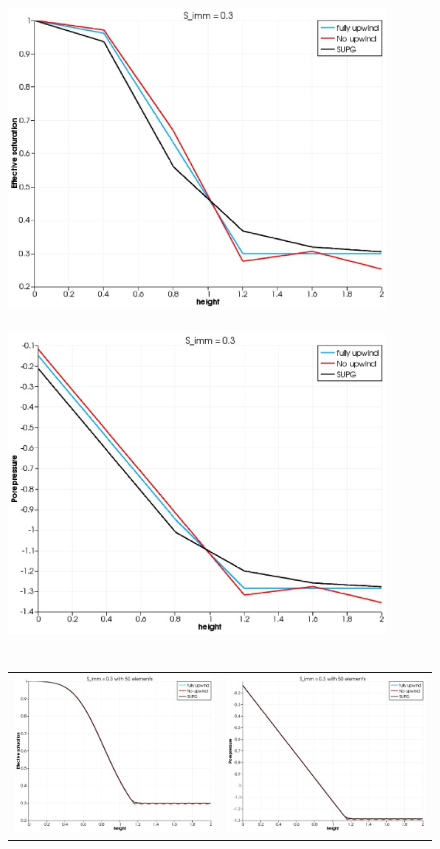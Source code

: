 \documentclass[]{scrreprt}
\begin{document}
\begin{figure}[htb]
\centering
\includegraphics[width=10cm]{gh_seff.eps} \\
$\mbox{}$ \\
\includegraphics[width=10cm]{gh_p.eps} \\
$\mbox{}$ \\
\begin{tabular}{cc}
\includegraphics[width=8cm]{gh_seff_50.eps} &
\includegraphics[width=8cm]{gh_p_50.eps} 

\end{tabular}
\end{figure}
\end{document}
